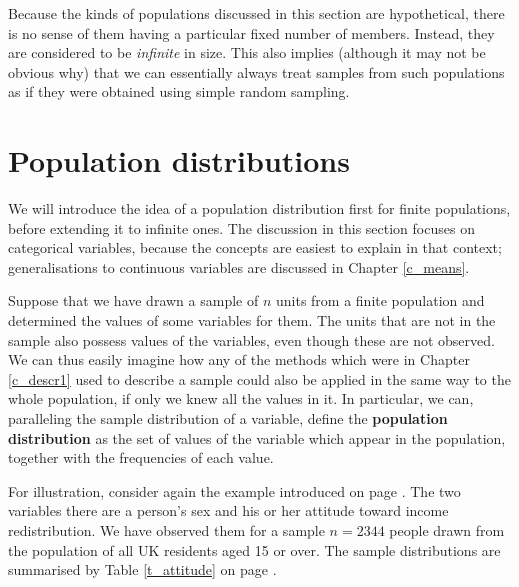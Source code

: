 Because the kinds of populations discussed in this section are
hypothetical, there is no sense of them having a particular fixed number
of members. Instead, they are considered to be \emph{infinite} in size.
This also implies (although it may not be obvious why) that we can
essentially always treat samples from such populations as if they were
obtained using simple random sampling.

\section{Population distributions}
\label{s_samples_popdistrs}

We will introduce the idea of a population distribution first for finite
populations, before extending it to infinite ones. The discussion in
this section focuses on categorical variables, because the concepts are
easiest to explain in that context; generalisations to continuous
variables are discussed in Chapter \ref{c_means}.

Suppose that we have drawn a sample of $n$ units from a finite
population and determined the values of some variables for them. The
units that are not in the sample also possess values of the variables,
even though these are not observed. We can thus easily imagine how any
of the methods which were in Chapter \ref{c_descr1} used to describe a
sample could also be applied in the same way to the whole population, if
only we knew all the values in it. In particular, we can, paralleling
the sample distribution of a variable, define the \textbf{population
distribution} as the set of values of the variable which appear in the
population, together with the frequencies of each value.

For illustration, consider again the example introduced on page
\pageref{p_ess_example}. The two variables there are a
person's sex and his or her attitude toward income redistribution. We
have observed them for a sample $n=2344$ people drawn from the
population of all UK residents aged 15 or over. The sample distributions
are summarised by Table \ref{t_attitude} on page \pageref{t_attitude}.

